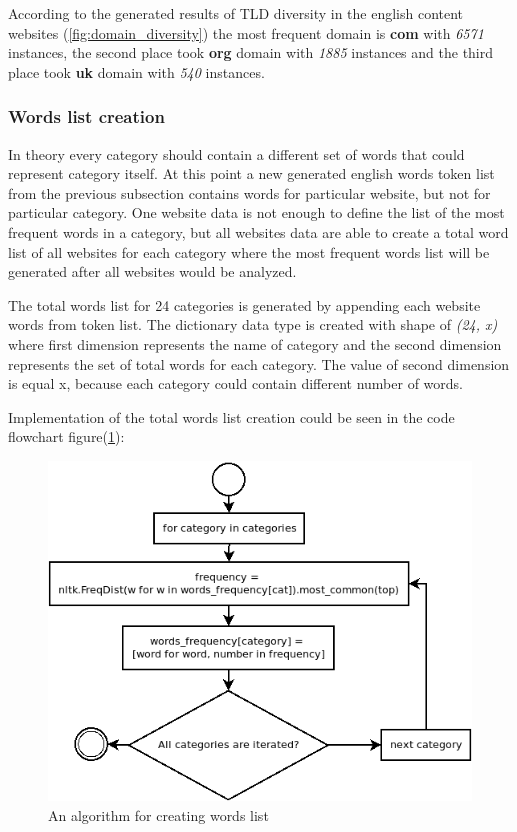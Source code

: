 According to the generated results of TLD diversity in the english content websites (\ref{fig:domain_diversity}) the most frequent domain is \textbf{com} with \textit{6571} instances, the second place took \textbf{org} domain with \textit{1885} instances and the third place took \textbf{uk} domain with \textit{540} instances.

\subsubsection{Words list creation}

In theory every category should contain a different set of words that could represent category itself. At this point a new generated english words token list from the previous subsection contains words for particular website, but not for particular category. One website data is not enough to define the list of the most frequent words in a category, but all websites data are able to create a total word list of all websites for each category where the most frequent words list will be generated after all websites would be analyzed.

The total words list for 24 categories is generated by appending each website words from token list. The dictionary data type is created with shape of \textit{(24, x)} where first dimension represents the name of category and the second dimension represents the set of total words for each category. The value of second dimension is equal x, because each category could contain different number of words. 


Implementation of the total words list creation could be seen in the code flowchart figure(\ref{fig:words_list_creation}):
\begin{figure}[H]
    \centering
    \includegraphics[width=1.05\textwidth]{Pictures/category_words_frequency.png}
    \caption{\label{fig:words_list_creation}{} An algorithm for creating words list }
\end{figure}

